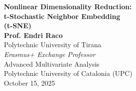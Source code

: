 \documentclass{beamer}
\begin{document}
\begin{frame}[plain]
\vspace{0.5cm}
\begin{center}
{\LARGE \textcolor{upcblue}{\textbf{Nonlinear Dimensionality Reduction:}}}\\[0.2cm]
{\huge \textcolor{upcblue}{\textbf{t-Stochastic Neighbor Embedding}}}\\[0.2cm]
{\huge \textcolor{upcblue}{\textbf{(t-SNE)}}}\\[1cm]

{\large \textbf{Prof. Endri Raco}}\\[0.2cm]
{\normalsize Polytechnic University of Tirana}\\[0.1cm]
{\small \textit{Erasmus+ Exchange Professor}}\\[0.8cm]

{\large \textcolor{upcgray}{Advanced Multivariate Analysis}}\\[0.2cm]
{\normalsize Polytechnic University of Catalonia (UPC)}\\[0.3cm]
{\normalsize October 15, 2025}
\end{center}

\vspace{0.3cm}
\begin{center}
\end{center}
\end{frame}
\end{document}
